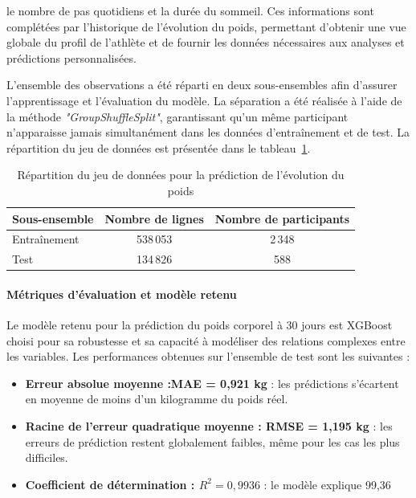 ﻿\documentclass[a4paper,12pt]{report}
\begin{document}
 le nombre de pas quotidiens et la durée du sommeil. Ces informations sont complétées par l’historique de l’évolution du poids, 
 permettant d’obtenir une vue globale du profil de l’athlète et de fournir les données nécessaires aux analyses et prédictions personnalisées.


L'ensemble des observations a été réparti en deux sous-ensembles afin d'assurer
l'apprentissage et l'évaluation du modèle. La séparation a été réalisée à l'aide
de la méthode \textit{"GroupShuffleSplit"}, garantissant qu'un même participant
n'apparaisse jamais simultanément dans les données d'entraînement et de test.
La répartition du jeu de données est présentée dans le tableau~\ref{tab:split_weight}.
\begin{table}[H]
\centering
\caption{Répartition du jeu de données pour la prédiction de l'évolution du poids}
\label{tab:split_weight}
\begin{tabular}{|l|c|c|}
\hline
\textbf{Sous-ensemble} & \textbf{Nombre de lignes} & \textbf{Nombre de participants} \\ \hline
Entraînement & 538\,053 & 2\,348 \\ \hline
Test & 134\,826 & 588 \\ \hline
\end{tabular}
\end{table}
\paragraph{Métriques d’évaluation et modèle retenu}

Le modèle retenu pour la prédiction du poids corporel à 30 jours est XGBoost choisi pour sa robustesse et sa capacité à modéliser des relations complexes entre les variables. Les performances obtenues sur l’ensemble de test sont les suivantes :

\begin{itemize}
\item \textbf{ Erreur absolue moyenne :MAE = 0,921 kg} : les prédictions s’écartent en moyenne de moins d’un kilogramme du poids réel.
\item \textbf{ Racine de l'erreur quadratique moyenne : RMSE = 1,195 kg} : les erreurs de prédiction restent globalement faibles, même pour les cas les plus difficiles.
\item \textbf{ Coefficient de détermination : $R^2 = 0,9936$} : le modèle explique 99,36 %
\end{itemize}
\end{document}
